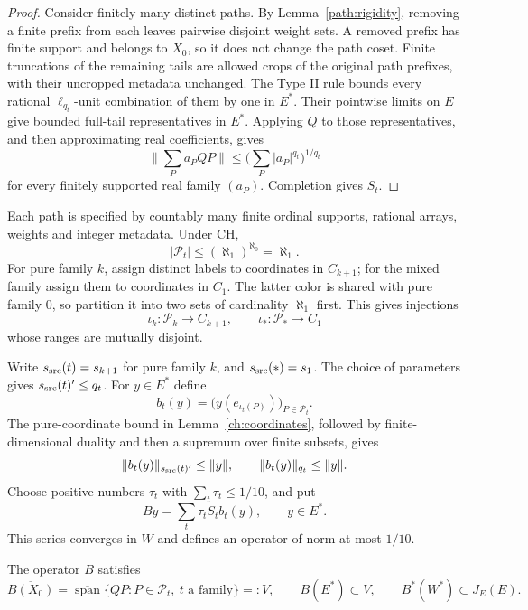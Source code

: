 \begin{proof}
Consider finitely many distinct paths. By Lemma~\ref{path:rigidity},
removing a finite prefix from each leaves pairwise disjoint weight sets.
A removed prefix has finite support and belongs to $X_0$, so it does not
change the path coset. Finite truncations of the remaining tails are
allowed crops of the original path prefixes, with their uncropped metadata
unchanged. The Type II rule bounds every rational
$\ell_{q_t}$-unit combination of them by one in $E^*$. Their pointwise
limits on $E$ give bounded full-tail representatives in
$E^*$. Applying $Q$ to those representatives, and then approximating real
coefficients, gives
\[
 \Big\|\sum_P a_P QP\Big\|\le
 \Big(\sum_P|a_P|^{q_t}\Big)^{1/q_t}
\]
for every finitely supported real family $(a_P)$. Completion gives $S_t$.
\end{proof}

Each path is specified by countably many finite ordinal supports, rational
arrays, weights and integer metadata. Under CH,
\[
 |\mathcal P_t|\le(\aleph_1)^{\aleph_0}=\aleph_1.
\]
For pure family $k$, assign distinct labels to coordinates in $C_{k+1}$;
for the mixed family assign them to coordinates in $C_1$. The latter
color is shared with pure family $0$, so partition it into two sets of
cardinality $\aleph_1$ first. This gives injections
\[
 \iota_k:\mathcal P_k\to C_{k+1},\qquad
 \iota_*:\mathcal P_*\to C_1
\]
whose ranges are mutually disjoint.

Write $s_{\rm src}(t)=s_{k+1}$ for pure family $k$, and $s_{\rm src}(*)=s_1$.
The choice of parameters gives $s_{\rm src}(t)'\le q_t$. For $y\in E^*$ define
\[
 b_t(y)=\big(y(e_{\iota_t(P)})\big)_{P\in\mathcal P_t}.
\]
The pure-coordinate bound in Lemma~\ref{ch:coordinates}, followed by
finite-dimensional duality and then a supremum over finite subsets, gives
\[
 \|b_t(y)\|_{s_{\rm src}(t)'}\le\|y\|,
 \qquad \|b_t(y)\|_{q_t}\le\|y\|.
\]
Choose positive numbers $\tau_t$ with $\sum_t\tau_t\le1/10$, and put
\[
 By=\sum_t\tau_t S_tb_t(y),\qquad y\in E^*.
\]
This series converges in $W$ and defines an operator of norm at most
$1/10$.

\begin{lemma}\label{twist:properties}
The operator $B$ satisfies
\[
 \overline{B(X_0)}=\overline{\operatorname{span}}
       \{QP:P\in\mathcal P_t,\ t\text{ a family}\}=:V,
 \qquad B(E^*)\subset V,
 \qquad B^*(W^*)\subset J_E(E).
\]
\end{lemma}

